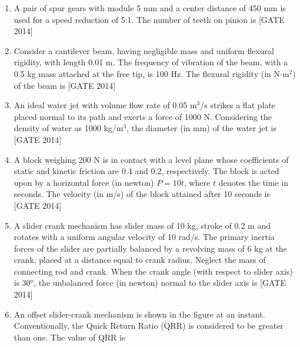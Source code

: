\documentclass[journal,12pt,onecolumn]{IEEEtran}
\theoremstyle{remark}
\begin{document}
\begin{enumerate}
    \begin{multicols}{4}
    \begin{enumerate}
         \item 0.69
        \item 0.88
        \item 0.98
        \item 1.37
    
    \end{enumerate}
       
    \end{multicols}

    \item A pair of spur gears with module 5 mm and a center distance of 450 mm is used for a speed reduction of 5:1. The number of teeth on pinion is \underline{\hspace{2cm}} \hfill{[GATE 2014]}\\

   
    \item Consider a cantilever beam, having negligible mass and uniform flexural rigidity, with length 0.01 m. The frequency of vibration of the beam, with a 0.5 kg mass attached at the free tip, is 100 Hz. The flexural rigidity (in N$\cdot$m$^2$) of the beam is \underline{\hspace{2cm}} \hfill{[GATE 2014]}\\

    \item An ideal water jet with volume flow rate of 0.05 m$^3$/s strikes a flat plate placed normal to its path and exerts a force of 1000 N. Considering the density of water as 1000 kg/m$^3$, the diameter (in mm) of the water jet is \underline{\hspace{2cm}} \hfill{[GATE 2014]}\\
 

    \item A block weighing 200 N is in contact with a level plane whose coefficients of static and kinetic friction are 0.4 and 0.2, respectively. The block is acted upon by a horizontal force (in newton) $P = 10t$, where $t$ denotes the time in seconds. The velocity (in m/s) of the block attained after 10 seconds is \underline{\hspace{2cm}} \hfill{[GATE 2014]}\\

      \item A slider crank mechanism has slider mass of 10 kg, stroke of 0.2 m and rotates with a uniform angular velocity of 10 rad/s. The primary inertia forces of the slider are partially balanced by a revolving mass of 6 kg at the crank, placed at a distance equal to crank radius. Neglect the mass of connecting rod and crank. When the crank angle (with respect to slider axis) is 30°, the unbalanced force (in newton) normal to the slider axis is\underline{\hspace{2cm}} \hfill{[GATE 2014]}
\\
 \item An offset slider-crank mechanism is shown in the figure at an instant. Conventionally, the Quick  Return Ratio (QRR) is considered to be greater than one. The value of QRR is 


\end{enumerate}
\end{document}
